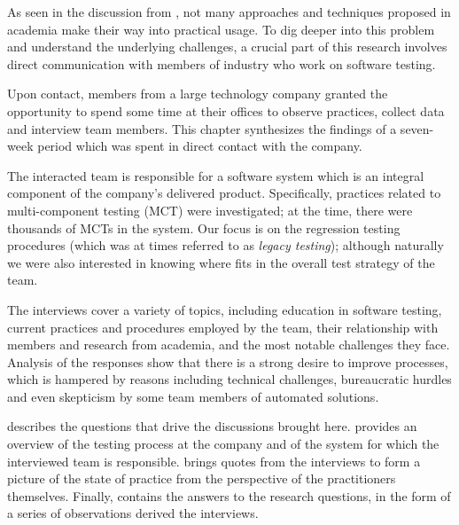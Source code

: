 
As seen in the discussion from , not many \rt approaches and techniques proposed in academia make their way into practical usage.
To dig deeper into this problem and understand the underlying challenges, a crucial part of this research involves direct communication with members of industry who work on software testing.

Upon contact, members from a large technology company granted the opportunity to spend some time at their offices to observe practices, collect data and interview team members.
This chapter synthesizes the findings of a seven-week period which was spent in direct contact with the company.

The interacted team is responsible for a software system which is an integral component of the company's delivered product.
Specifically, practices related to multi-component testing (MCT) were investigated; at the time, there were thousands of MCTs in the system.
Our focus is on the regression testing procedures (which was at times referred to as \textit{legacy testing}); although naturally we were also interested in knowing where \rt fits in the overall test strategy of the team.

The interviews cover a variety of topics, including education in software testing, current practices and procedures employed by the team, their relationship with members and research from academia, and the most notable challenges they face.
Analysis of the responses show that there is a strong desire to improve processes, which is hampered by reasons including technical challenges, bureaucratic hurdles and even skepticism by some team members of automated solutions.

 describes the questions that drive the discussions brought here.
 provides an overview of the testing process at the company and of the system for which the interviewed team is responsible.
 brings quotes from the interviews to form a picture of the state of practice from the perspective of the practitioners themselves.
Finally,  contains the answers to the research questions, in the form of a series of observations derived the interviews.



